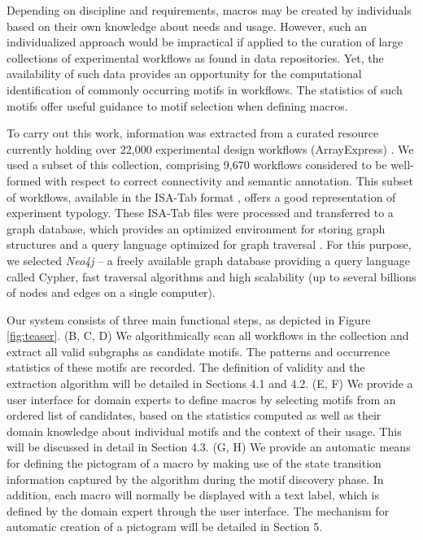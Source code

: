 \vspace{-1mm}
Depending on discipline and requirements, macros may be created by individuals based on their own knowledge about needs and usage.
However, such an individualized approach would be impractical if applied to the curation of large collections of experimental workflows as found in data repositories.
Yet, the availability of such data provides an opportunity for the computational identification of commonly occurring motifs in workflows.
The statistics of such motifs offer useful guidance to motif selection when defining macros.

To carry out this work, information was extracted from a curated resource currently holding over 22,000 experimental design workflows (ArrayExpress) \cite{ArrayExpress::2012}.
We used a subset of this collection, comprising 9,670 workflows considered to be well-formed with respect to correct connectivity and semantic annotation.
This subset of workflows, available in the ISA-Tab format \cite{rocca-serra10, sansone12}, offers a good representation of experiment typology.
These ISA-Tab files were processed and transferred to a graph database, which provides an optimized environment for storing graph structures and a query language optimized for graph traversal \cite{batra12}. 
For this purpose, we selected \emph{Neo4j} \cite{Neo4J::2012} -- a freely available graph database providing a query language called Cypher, fast traversal algorithms and high scalability (up to several billions of nodes and edges on a single computer).

Our system consists of three main functional steps, as depicted in Figure \ref{fig:teaser}.
(B, C, D) We algorithmically scan all workflows in the collection and extract all valid subgraphs as candidate motifs.
The patterns and occurrence statistics of these motifs are recorded.
The definition of validity and the extraction algorithm will be detailed in Sections 4.1 and 4.2.
(E, F) We provide a user interface for domain experts to define macros by selecting motifs from an ordered list of candidates, based on the statistics computed as well as their domain knowledge about individual motifs and the context of their usage.
This will be discussed in detail in Section 4.3.
(G, H) We provide an automatic means for defining the pictogram of a macro by making use of the state transition information captured by the algorithm during the motif discovery phase.
In addition, each macro will normally be displayed with a text label, which is defined by the domain expert through the user interface.
The mechanism for automatic creation of a pictogram will be detailed in Section 5.

